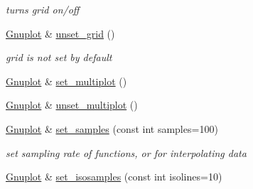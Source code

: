 \begin{DoxyCompactItemize}
\begin{DoxyCompactList}\small\item\em turns grid on/off \end{DoxyCompactList}\item 
\hypertarget{class_gnuplot_a53183e1487bc6977f0d46bf75d19b4d3}{\hyperlink{class_gnuplot}{Gnuplot} \& \hyperlink{class_gnuplot_a53183e1487bc6977f0d46bf75d19b4d3}{unset\-\_\-grid} ()}\label{class_gnuplot_a53183e1487bc6977f0d46bf75d19b4d3}

\begin{DoxyCompactList}\small\item\em grid is not set by default \end{DoxyCompactList}\item 
\hyperlink{class_gnuplot}{Gnuplot} \& \hyperlink{class_gnuplot_a67efc4d4dc46b6100d14ba2f7366ef11}{set\-\_\-multiplot} ()
\item 
\hyperlink{class_gnuplot}{Gnuplot} \& \hyperlink{class_gnuplot_aad76cdec16cfb5fdf82f45ed2786f4d8}{unset\-\_\-multiplot} ()
\item 
\hypertarget{class_gnuplot_a671cbe7b18a267ea59f532c83a0035f6}{\hyperlink{class_gnuplot}{Gnuplot} \& \hyperlink{class_gnuplot_a671cbe7b18a267ea59f532c83a0035f6}{set\-\_\-samples} (const int samples=100)}\label{class_gnuplot_a671cbe7b18a267ea59f532c83a0035f6}

\begin{DoxyCompactList}\small\item\em set sampling rate of functions, or for interpolating data \end{DoxyCompactList}\item 
\hypertarget{class_gnuplot_ab810fa4c02fb49ae197786c305b78702}{\hyperlink{class_gnuplot}{Gnuplot} \& \hyperlink{class_gnuplot_ab810fa4c02fb49ae197786c305b78702}{set\-\_\-isosamples} (const int isolines=10)}\label{class_gnuplot_ab810fa4c02fb49ae197786c305b78702}


\end{DoxyCompactItemize}
